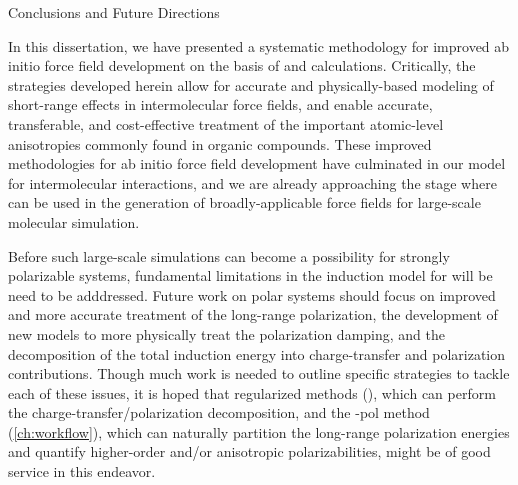 \begin{chapter}{Conclusions and Future Directions}
\label{ch:conclusions}

In this dissertation, we have presented a systematic methodology for improved
ab initio force field development on the basis of \sapt and \isa calculations.
Critically, the strategies developed herein allow for accurate and
physically-based modeling of short-range effects in intermolecular force
fields, and enable accurate, transferable, and cost-effective treatment of the
important atomic-level anisotropies commonly found in organic
compounds. These improved methodologies for ab initio force field development
have culminated in our \mastiff model for intermolecular interactions, and we
are already approaching the stage where \mastiff can be used in the generation of
broadly-applicable force fields for large-scale molecular simulation. 

Before such large-scale simulations can become a possibility for strongly
polarizable systems, fundamental limitations in the induction model for
\mastiff  will be need to be
adddressed. 
Future work on polar systems should focus on improved and more accurate treatment of the long-range polarization, 
the development of new models to more physically treat the polarization
damping, and the decomposition of the total induction energy into
charge-transfer and polarization contributions.
Though much work is needed to outline
specific strategies to tackle each of these issues, it is hoped that
regularized \sapt methods (), which can perform the
charge-transfer/polarization decomposition, and the \isa-pol method
(\cref{ch:workflow}), which can naturally partition the long-range polarization
energies and quantify higher-order and/or anisotropic polarizabilities, might
be of good service in this endeavor. 


\end{chapter}
